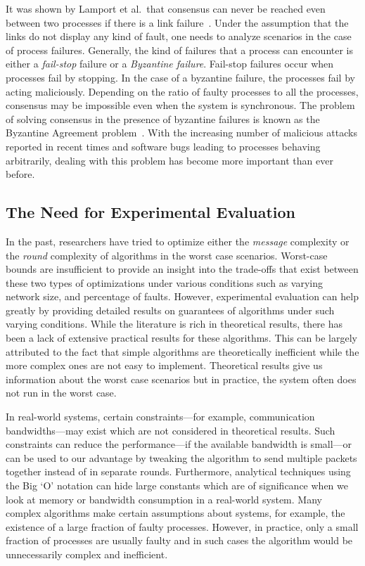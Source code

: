 It was shown by Lamport et al.\ that consensus can never be reached even
between two processes if there is a link failure~\cite{LamportSP82}. Under the
assumption that the links do not display any kind of fault, one needs to
analyze scenarios in the case of process failures. Generally, the kind of
failures that a process can encounter is either a \textit{fail-stop} failure or
a \textit{Byzantine failure}. Fail-stop failures occur when processes fail by
stopping. In the case of a byzantine failure, the processes fail by acting
maliciously. Depending on the ratio of faulty processes to all the processes,
consensus may be impossible even when the system is synchronous. The problem of
solving consensus in the presence of byzantine failures is known as the
Byzantine Agreement problem~\cite{LamportSP82}. With the increasing number of
malicious attacks reported in recent times and software bugs leading to
processes behaving arbitrarily, dealing with this problem has become more
important than ever before.

\subsection{The Need for Experimental Evaluation}

In the past, researchers have tried to optimize either the \textit{message}
complexity or the \textit{round} complexity of algorithms in the worst case
scenarios. Worst-case bounds are insufficient to provide an insight into the
trade-offs that exist between these two types of optimizations under various
conditions such as varying network size, and percentage of faults. However,
experimental evaluation can help greatly by providing detailed results on
guarantees of algorithms under such varying conditions.  While the literature
is rich in theoretical results, there has been a lack of extensive practical
results for these algorithms. This can be largely attributed to the fact that
simple algorithms are theoretically inefficient while the more complex ones are
not easy to implement. Theoretical results give us information about the worst
case scenarios but in practice, the system often does not run in the worst
case. 

In real-world systems, certain constraints---for example, communication
ban\-d\-widths---may exist which are not considered in theoretical results.
Such constraints can reduce the performance---if the available bandwidth is
small---or can be used to our advantage by tweaking the algorithm to send
multiple packets together instead of in separate rounds. Furthermore,
analytical techniques using the Big `O' notation can hide large constants which
are of significance when we look at memory or bandwidth consumption in
a real-world system. Many complex algorithms make certain assumptions about
systems, for example, the existence of a large fraction of faulty processes.
However, in practice, only a small fraction of processes are usually faulty and
in such cases the algorithm would be unnecessarily complex and inefficient.


